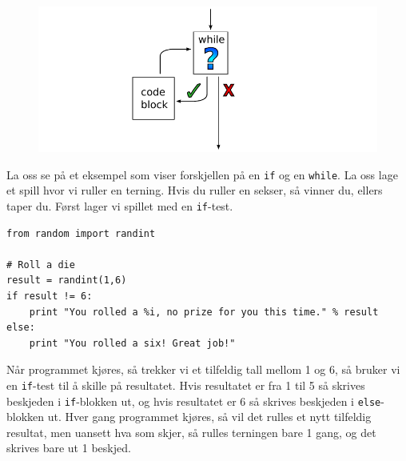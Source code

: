 \documentclass[a4paper, 11pt, notitlepage]{article}
\begin{document}
\begin{figure}[htpb]
\centering
\includegraphics[width=\textwidth]{while_loop}
\end{figure}

La oss se på et eksempel som viser forskjellen på en \verb+if+ og en \verb+while+. La oss lage et spill hvor vi ruller en terning. Hvis du ruller en sekser, så vinner du, ellers taper du. Først lager vi spillet med en \verb+if+-test.
\begin{lstlisting}
from random import randint

# Roll a die
result = randint(1,6)
if result != 6:
	print "You rolled a %i, no prize for you this time." % result
else:
	print "You rolled a six! Great job!"
\end{lstlisting}
Når programmet kjøres, så trekker vi et tilfeldig tall mellom 1 og 6, så bruker vi en \verb+if+-test til å skille på resultatet. Hvis resultatet er fra 1 til 5 så skrives beskjeden i \verb+if+-blokken ut, og hvis resultatet er 6 så skrives beskjeden i \verb+else+-blokken ut. Hver gang programmet kjøres, så vil det rulles et nytt tilfeldig resultat, men uansett hva som skjer, så rulles terningen bare 1 gang, og det skrives bare ut 1 beskjed.
\end{document}
